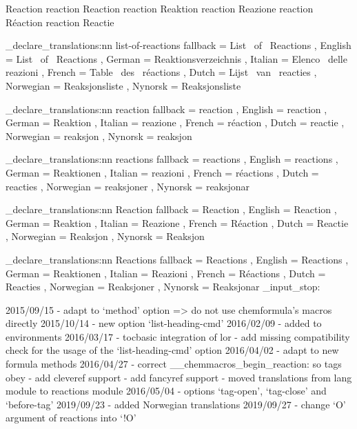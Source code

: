  {Reaction}
   {reaction} {Reaction}
    {reaction} {Reaktion}
   {reaction} {Reazione}
    {reaction} {R\'{e}action}
     {reaction} {Reactie}
\EndChemCompatibility

\chemmacros_declare_translations:nn {list-of-reactions}
  {
    fallback  = List~ of~ Reactions ,
    English   = List~ of~ Reactions ,
    German    = Reaktionsverzeichnis ,
    Italian   = Elenco~ delle~ reazioni ,
    French    = Table~ des~ r\'{e}actions ,
    Dutch     = Lijst~ van~ reacties ,
    Norwegian = Reaksjonsliste ,
    Nynorsk   = Reaksjonsliste
  }

\chemmacros_declare_translations:nn {reaction}
  {
    fallback  = reaction ,
    English   = reaction ,
    German    = Reaktion ,
    Italian   = reazione ,
    French    = r\'{e}action ,
    Dutch     = reactie ,
    Norwegian = reaksjon ,
    Nynorsk   = reaksjon
  }

\chemmacros_declare_translations:nn {reactions}
  {
    fallback  = reactions ,
    English   = reactions ,
    German    = Reaktionen ,
    Italian   = reazioni ,
    French    = r\'{e}actions ,
    Dutch     = reacties ,
    Norwegian = reaksjoner ,
	Nynorsk   = reaksjonar
  }

\chemmacros_declare_translations:nn {Reaction}
  {
    fallback  = Reaction ,
    English   = Reaction ,
    German    = Reaktion ,
    Italian   = Reazione ,
    French    = R\'{e}action ,
    Dutch     = Reactie ,
    Norwegian = Reaksjon ,
    Nynorsk   = Reaksjon
  }

\chemmacros_declare_translations:nn {Reactions}
  {
    fallback = Reactions ,
    English  = Reactions ,
    German   = Reaktionen ,
    Italian  = Reazioni ,
    French   = R\'{e}actions ,
    Dutch    = Reacties ,
    Norwegian = Reaksjoner ,
    Nynorsk   = Reaksjonar
 }
\EndChemCompatibility
\file_input_stop:

2015/09/15 - adapt to `method' option => do not use chemformula's macros
             directly
2015/10/14 - new option `list-heading-cmd'
2016/02/09 - added \ignorespacesafterend to environments
2016/03/17 - tocbasic integration of lor
           - add missing compatibility check for the usage of the
             `list-heading-cmd' option
2016/04/02 - adapt to new formula methods
2016/04/27 - correct \__chemmacros_begin_reaction: so tags obey \thereaction
           - add cleveref support
           - add fancyref support
           - moved translations from lang module to reactions module
2016/05/04 - options `tag-open', `tag-close' and `before-tag'
2019/09/23 - added Norwegian translations
2019/09/27 - change `O{}' argument of reactions into `!O{}'
